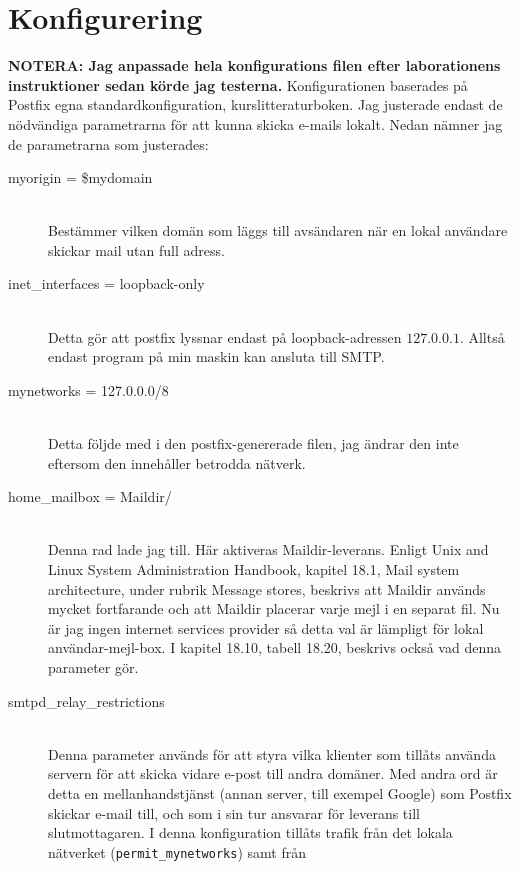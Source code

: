 \documentclass{report}
\begin{document}
\section{Konfigurering}
\textbf{NOTERA: Jag anpassade hela konfigurations filen efter laborationens instruktioner sedan körde jag testerna.}
\newline\newline
Konfigurationen baserades på Postfix egna standardkonfiguration, kurslitteraturboken. \cite{ULSAH}\cite{pf_std_conf}
\newline
Jag justerade endast de nödvändiga parametrarna för att kunna skicka e-mails lokalt. Nedan nämner jag de parametrarna som justerades:
\begin{description}
    \item[myorigin = \$mydomain] \hfill \\
    Bestämmer vilken domän som läggs till avsändaren när en lokal användare skickar mail utan full adress.
    \item[inet\_interfaces = loopback-only] \hfill \\
    Detta gör att postfix lyssnar endast på loopback-adressen \(127.0.0.1\). Alltså endast program på min maskin kan ansluta till SMTP.
    \item[mynetworks = 127.0.0.0/8] \hfill \\
    Detta följde med i den postfix-genererade filen, jag ändrar den inte eftersom den innehåller betrodda nätverk.
    \item[home\_mailbox = Maildir/] \hfill \\
    Denna rad lade jag till. Här aktiveras Maildir-leverans. Enligt Unix and Linux System Administration Handbook, kapitel 18.1, Mail system architecture, under rubrik Message stores, beskrivs 
    att Maildir används mycket fortfarande och att Maildir placerar varje mejl i en separat fil. Nu är jag ingen internet services provider så detta val är lämpligt för lokal användar-mejl-box.
    I kapitel 18.10, tabell 18.20, beskrivs också vad denna parameter gör. \cite{ULSAH}
    \item[smtpd\_relay\_restrictions] \hfill \\
    Denna parameter används för att styra vilka klienter som tillåts använda servern för att skicka vidare e-post
    till andra domäner. Med andra ord är detta en mellanhandstjänst (annan server, till exempel Google) som Postfix
    skickar e-mail till, och som i sin tur ansvarar för leverans till slutmottagaren.
    I denna konfiguration tillåts trafik från det lokala nätverket (\texttt{permit\_mynetworks}) samt från

\end{description}
\end{document}
